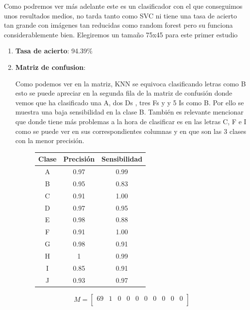 \documentclass[8pt,a4paper]{{esannV2}}
\begin{document}
Como podremos ver más adelante este es un clasificador con el que conseguimos unos resultados medios, no tarda tanto como SVC ni tiene una tasa de acierto tan grande con imágenes tan reducidas como random forest pero su funciona considerablemente bien.
Elegiremos un tamaño 75x45 para este primer estudio
\begin{enumerate}
\item \textbf{Tasa de acierto}: 94.39$\%$

\item \textbf{Matriz de confusion}:
	
Como podemos ver en la matriz, KNN se equivoca clasificando letras como B esto se puede apreciar en la segunda fila de la matriz de confusión donde vemos que ha clasificado una A, dos Ds , tres Fs y y 5 Is como B. Por ello se muestra una baja sensibilidad en la clase B. También es relevante mencionar que donde tiene más problemas a la hora de clasificar es en las letras C, F e I como se puede ver en sus correspondientes columnas y en que son las 3 clases con la menor precisión.
\begin{figure}[h!]
\centering
\begin{minipage}{.5\textwidth}
    \begin{tabular}{|c|c|c|} %
    \hline
      \textbf{Clase} & \textbf{Precisión} & \textbf{Sensibilidad}\\
      \hline
      A & 0.97 & 0.99\\
      \hline
      B & 0.95 & 0.83\\
      \hline
      C & 0.91 & 1.00\\
      \hline
      D & 0.97 & 0.95\\
      \hline
      E & 0.98 & 0.88\\
      \hline
      F & 0.91 & 1.00\\
      \hline
      G & 0.98 & 0.91\\
      \hline
      H & 1    & 0.99\\
      \hline
      I & 0.85 & 0.91\\
      \hline
      J & 0.93 & 0.97\\
      \hline
    \end{tabular}
\end{minipage}%
\begin{minipage}{.5\textwidth}
\[
M=
  \begin{bmatrix}
    69 & 1 & 0 & 0 & 0 & 0 & 0 & 0 & 0 & 0 \\

\end{bmatrix}\]
\end{minipage}
\end{figure}
\end{enumerate}
\end{document}
